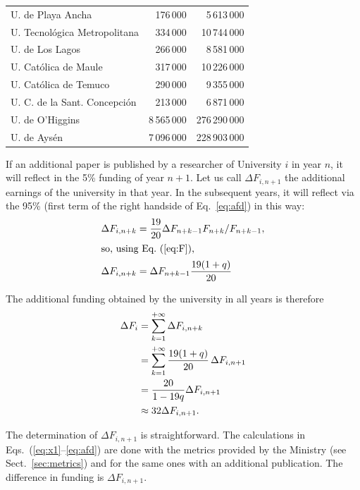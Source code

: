 \documentclass[twocolumn]{article}
\begin{document}
\begin{table}
\begin{tabular}{lrr}
U. de Playa Ancha            &    176\,000 &   5\,613\,000\\
U. Tecnológica Metropolitana &    334\,000 &  10\,744\,000\\
U. de Los Lagos              &    266\,000 &   8\,581\,000\\
U. Católica de Maule         &    317\,000 &  10\,226\,000\\
U. Católica de Temuco        &    290\,000 &   9\,355\,000\\
U. C. de la Sant. Concepción &    213\,000 &   6\,871\,000\\
U. de O'Higgins	             & 8\,565\,000 & 276\,290\,000\\
U. de Aysén                  & 7\,096\,000 & 228\,903\,000\\
\hline
\end{tabular}
\end{table}
If an additional paper is published by a researcher of University $i$ in year $n$, it will reflect in 
the 5\% funding of year $n + 1$. Let us call $\Delta F_{i,n+1}$ the additional earnings 
of the university in that year.  In the subsequent years, it will reflect via the 95\% 
(first term of the right handside of Eq.~\ref{eq:afd}) in this way:
\begin{align}
   \Delta F_{i,n+k} &=  \frac{19}{20} \Delta F_{n+k-1} F_{n+k}  / F_{n+k-1}, \notag\\
\intertext{so, using Eq.~(\ref{eq:F}),}
   \Delta F_{i,n+k} &= \Delta F_{n+k-1}  \frac{ 19 (1 + q)} { 20}
\end{align}

The additional funding obtained by the university in all years is therefore
\begin{align}
    \Delta F_{i} &= \sum_{k=1}^{+\infty} \Delta F_{i,n+k} \notag \\
                 &= \sum_{k=1}^{+\infty} \frac{19(1 + q)}{20} \,\Delta F_{i,n+1} \notag \\
                 &= \frac{20} { 1 - 19q } \Delta F_{i,n+1}\\
                 &\approx 32 \Delta F_{i,n+1}. \notag
\end{align}

The determination of $\Delta F_{i,n+1}$ is straightforward.  The calculations
in Eqs.~(\ref{eq:x1}--\ref{eq:afd}) are done with the metrics provided by the
Ministry (see Sect.~\ref{sec:metrics}) and for the same ones with an additional
publication.  The difference in funding is $\Delta F_{i,n+1}$. 
\end{document}
